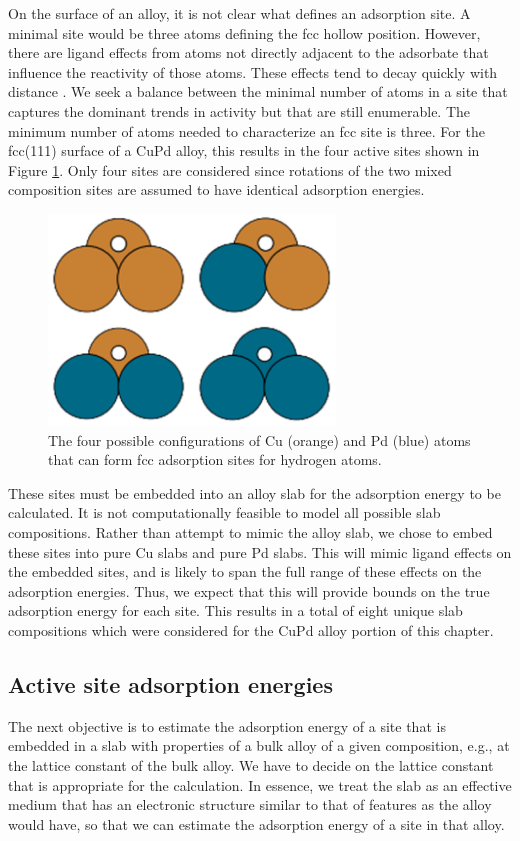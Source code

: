 \documentclass[12pt]{cmuthesis}
\begin{document}
On the surface of an alloy, it is not clear what defines an adsorption site. A minimal site would be three atoms defining the fcc hollow position. However, there are ligand effects from atoms not directly adjacent to the adsorbate that influence the reactivity of those atoms. These effects tend to decay quickly with distance \cite{inoglu-2010-new-solid}. We seek a balance between the minimal number of atoms in a site that captures the dominant trends in activity but that are still enumerable. The minimum number of atoms needed to characterize an fcc site is three. For the fcc(111) surface of a CuPd alloy, this results in the four active sites shown in Figure \ref{fig-configs}. Only four sites are considered since rotations of the two mixed composition sites are assumed to have identical adsorption energies.

\begin{figure}[h]
\centering
\includegraphics[width=3in]{./images/configs.png}
\caption{The four possible configurations of Cu (orange) and Pd (blue) atoms that can form fcc adsorption sites for hydrogen atoms. \label{fig-configs}}
\end{figure}

These sites must be embedded into an alloy slab for the adsorption energy to be calculated. It is not computationally feasible to model all possible slab compositions. Rather than attempt to mimic the alloy slab, we chose to embed these sites into pure Cu slabs and pure Pd slabs. This will mimic ligand effects on the embedded sites, and is likely to span the full range of these effects on the adsorption energies. Thus, we expect that this will provide bounds on the true adsorption energy for each site. This results in a total of eight unique slab compositions which were considered for the CuPd alloy portion of this chapter.

\subsection{Active site adsorption energies}
\label{sec:org4a0ab19}
The next objective is to estimate the adsorption energy of a site that is embedded in a slab with properties of a bulk alloy of a given composition, e.g., at the lattice constant of the bulk alloy. We have to decide on the lattice constant that is appropriate for the calculation. In essence, we treat the slab as an effective medium that has an electronic structure similar to that of features as the alloy would have, so that we can estimate the adsorption energy of a site in that alloy.
\end{document}
